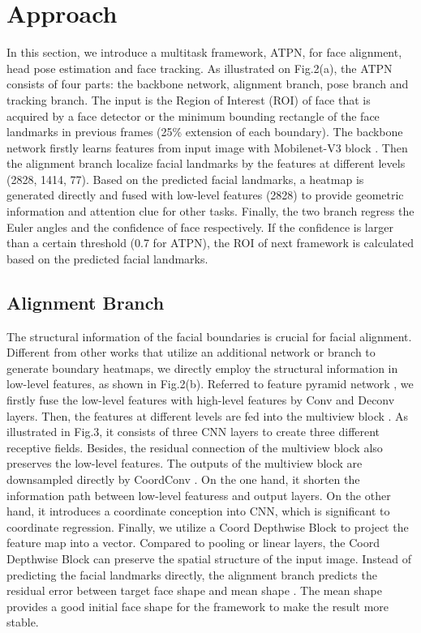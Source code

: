\documentclass[3p,twocolumn, round, sort & compress]{elsarticle}
\begin{document}
\section{Approach}
In this section, we introduce a multitask framework, ATPN, for face alignment, head pose estimation and face tracking. As illustrated on Fig.2(a), the ATPN consists of four parts: the backbone network, alignment branch, pose branch and tracking branch. The input is the Region of Interest (ROI) of face that is acquired by a face detector or the minimum bounding rectangle of the face landmarks in previous frames (25\% extension of each boundary). The backbone network firstly learns features from input image with Mobilenet-V3 block \citep{mobileV3}. Then the alignment branch localize facial landmarks by the features at different levels (2828, 1414, 77). Based on the predicted facial landmarks, a heatmap is generated directly and fused with low-level features (2828) to provide geometric information and attention clue for other tasks. Finally, the two branch regress the Euler angles and the confidence of face respectively. If the confidence is larger than a certain threshold (0.7 for ATPN), the ROI of next framework is calculated based on the predicted facial landmarks. 

\subsection{Alignment Branch}
The structural information of the facial boundaries is crucial for facial alignment. Different from other works \citep{LAB, PropNet} that utilize an additional network or branch to generate boundary heatmaps, we directly employ the structural information in low-level features, as shown in Fig.2(b). Referred to feature pyramid network \citep{FPN}, we firstly fuse the low-level features with high-level features by  Conv and Deconv layers. Then, the features at different levels are fed into the multiview block \citep{MVB}. As illustrated in Fig.3, it consists of three CNN layers to create three different receptive fields. Besides, the residual connection of the multiview block also preserves the low-level features. The outputs of the multiview block are downsampled directly by CoordConv \citep{CoordCNN}. On the one hand, it shorten the information path between low-level featuress and output layers. On the other hand, it introduces a coordinate conception into CNN, which is significant to coordinate regression. Finally, we utilize a  Coord Depthwise Block to project the feature map into a vector. Compared to pooling or linear layers, the Coord Depthwise Block can preserve the spatial structure of the input image. Instead of predicting the facial landmarks directly, the alignment branch predicts the residual error between target face shape  and mean shape . The mean shape  provides a good initial face shape for the framework to make the result more stable.    
 
\end{document}

